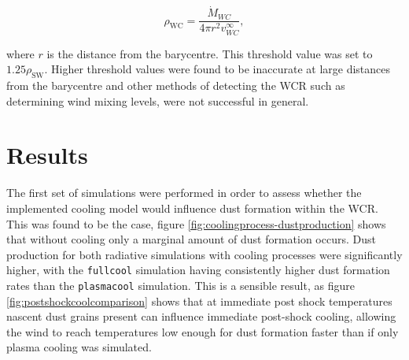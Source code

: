 \documentclass[fleqn,usenatbib]{mnras}
\begin{document}
\begin{equation}
  \rho_\text{WC} = \frac{\dot{M}_{WC}}{4 \pi r^2 v^\infty_{WC}},
\end{equation}

\noindent
where $r$ is the distance from the barycentre.
This threshold value was set to $1.25\rho_\text{SW}$.
Higher threshold values were found to be inaccurate at large distances from the barycentre and other methods of detecting the WCR such as determining wind mixing levels, were not successful in general.


\section{Results}
\label{sec:p1-results}

The first set of simulations were performed in order to assess whether the implemented cooling model would influence dust formation within the WCR.
This was found to be the case, figure \ref{fig:coolingprocess-dustproduction} shows that without cooling only a marginal amount of dust formation occurs.
Dust production for both radiative simulations with cooling processes were significantly higher, with the \texttt{fullcool} simulation having consistently higher dust formation rates than the \texttt{plasmacool} simulation.
This is a sensible result, as figure \ref{fig:postshockcoolcomparison} shows that at immediate post shock temperatures nascent dust grains present can influence immediate post-shock cooling, allowing the wind to reach temperatures low enough for dust formation faster than if only plasma cooling was simulated.
\end{document}
